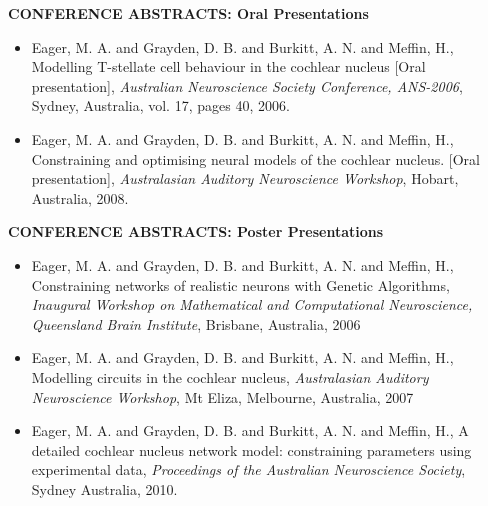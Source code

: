 \begin{preface}
{\textbf{CONFERENCE ABSTRACTS: Oral Presentations}

\begin{itemize}
 \item {Eager, M. A. and Grayden, D. B. and Burkitt, A. N. and Meffin, H.}, {Modelling T-stellate cell behaviour in the cochlear nucleus [Oral presentation]}, \textit{Australian Neuroscience Society Conference, ANS-2006}, {Sydney, Australia}, vol. 17, pages 40,  2006.
 \item {Eager, M. A. and Grayden, D. B. and Burkitt, A. N. and Meffin, H.}, {Constraining and optimising neural models of the cochlear nucleus.  [Oral presentation]}, \textit{Australasian Auditory Neuroscience Workshop}, {Hobart, Australia},  2008.
\end{itemize}

\textbf{CONFERENCE ABSTRACTS: Poster Presentations}
\begin{itemize}
 \item	 {Eager, M. A. and Grayden, D. B. and Burkitt, A. N. and Meffin, H.}, {Constraining networks of realistic neurons with {Genetic} {Algorithms}}, \textit{Inaugural Workshop on Mathematical and Computational Neuroscience, Queensland Brain Institute}, {Brisbane, Australia}, 2006
 \item {Eager, M. A. and Grayden, D. B. and Burkitt, A. N. and Meffin, H.}, {Modelling circuits in the cochlear nucleus}, \textit{Australasian Auditory Neuroscience Workshop}, {Mt Eliza, Melbourne, Australia}, 2007
 \item {Eager, M. A. and Grayden, D. B. and Burkitt, A. N. and Meffin, H.},  {A detailed cochlear nucleus network model: constraining parameters using experimental data}, \textit{Proceedings of the Australian Neuroscience Society}, Sydney Australia, 2010.
\end{itemize}

}












\end{preface}

